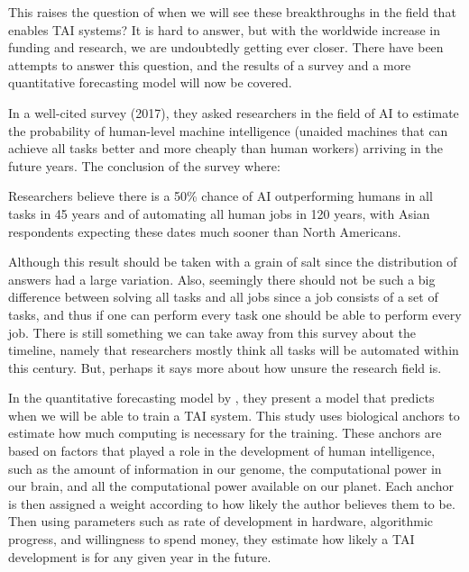 \documentclass[12pt,A4]{report}
\theoremstyle{definition}
\begin{document}
This raises the question of when we will see these breakthroughs in the field that enables TAI systems? It is hard to answer, but with the worldwide increase in funding and research\autocite{nature}, we are undoubtedly getting ever closer. There have been attempts to answer this question, and the results of a survey and a more quantitative forecasting model will now be covered. 

In a well-cited survey \autocite{Grace et al} (2017), they asked researchers in the field of AI to estimate the probability of human-level machine intelligence (unaided machines that can achieve all tasks better and more cheaply than human workers) arriving in the future years. The conclusion of the survey where:
\begin{displayquote}
Researchers believe there is a 50\% chance of AI outperforming humans in all tasks in 45 years and of automating all human jobs in 120 years, with Asian respondents expecting these dates much sooner than North Americans.
\end{displayquote}
Although this result should be taken with a grain of salt since the distribution of answers had a large variation. Also, seemingly there should not be such a big difference between solving all tasks and all jobs since a job consists of a set of tasks, and thus if one can perform every task one should be able to perform every job. There is still something we can take away from this survey about the timeline, namely that researchers mostly think all tasks will be automated within this century. But, perhaps it says more about how unsure the research field is. 

In the quantitative forecasting model by \autocite{Ajeya Cotra}, they present a model that predicts when we will be able to train a TAI system. This study uses biological anchors to estimate how much computing is necessary for the training. These anchors are based on factors that played a role in the development of human intelligence, such as the amount of information in our genome, the computational power in our brain, and all the computational power available on our planet. Each anchor is then assigned a weight according to how likely the author believes them to be. Then using parameters such as rate of development in hardware, algorithmic progress, and willingness to spend money, they estimate how likely a TAI development is for any given year in the future. 
\end{document}
